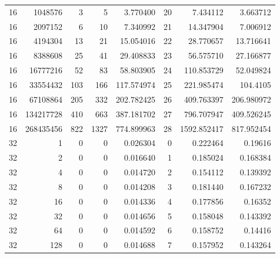 \begin{longtable}[c]{@{}rrrrrrrr@{}}
    16        & 1048576   & 3         & 5        & 3.770400    & 20                  & 7.434112    & 3.663712   \\
    16        & 2097152   & 6         & 10       & 7.340992    & 21                  & 14.347904   & 7.006912   \\
    16        & 4194304   & 13        & 21       & 15.054016   & 22                  & 28.770657   & 13.716641  \\
    16        & 8388608   & 25        & 41       & 29.408833   & 23                  & 56.575710   & 27.166877  \\
    16        & 16777216  & 52        & 83       & 58.803905   & 24                  & 110.853729  & 52.049824  \\
    16        & 33554432  & 103       & 166      & 117.574974  & 25                  & 221.985474  & 104.4105   \\
    16        & 67108864  & 205       & 332      & 202.782425  & 26                  & 409.763397  & 206.980972 \\
    16        & 134217728 & 410       & 663      & 387.181702  & 27                  & 796.707947  & 409.526245 \\
    16        & 268435456 & 822       & 1327     & 774.899963  & 28                  & 1592.852417 & 817.952454 \\
    32        & 1         & 0         & 0        & 0.026304    & 0                   & 0.222464    & 0.19616    \\
    32        & 2         & 0         & 0        & 0.016640    & 1                   & 0.185024    & 0.168384   \\
    32        & 4         & 0         & 0        & 0.014720    & 2                   & 0.154112    & 0.139392   \\
    32        & 8         & 0         & 0        & 0.014208    & 3                   & 0.181440    & 0.167232   \\
    32        & 16        & 0         & 0        & 0.014336    & 4                   & 0.177856    & 0.16352    \\
    32        & 32        & 0         & 0        & 0.014656    & 5                   & 0.158048    & 0.143392   \\
    32        & 64        & 0         & 0        & 0.014592    & 6                   & 0.158752    & 0.14416    \\
    32        & 128       & 0         & 0        & 0.014688    & 7                   & 0.157952    & 0.143264   \\

\end{longtable}

